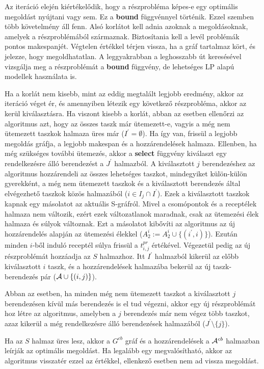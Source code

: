Az iteráció elején kiértékelődik, hogy a részprobléma képes-e egy optimális megoldást nyújtani vagy sem.
Ez a \textbf{bound} függvénnyel történik.
Ezzel szemben több követelmény áll fenn.
Alsó korlátot kell adnia azoknak a megoldásoknak, amelyek a részproblémából származnak.
Biztosítania kell a levél problémák pontos makespanjét.
Végtelen értékkel térjen vissza, ha a gráf tartalmaz kört, és jelezze, hogy megoldhatatlan.
A leggyakrabban a leghosszabb út keresésével vizsgálja meg a részproblémát a \textbf{bound} függvény, de lehetséges LP alapú modellek használata is.

Ha a korlát nem kisebb, mint az eddig megtalált legjobb eredmény, akkor az iteráció véget ér, és amennyiben létezik egy következő részprobléma, akkor az kerül kiválasztásra.
Ha viszont kisebb a korlát, abban az esetben ellenőrzi az algoritmus azt, hogy az összes taszk már ütemezett-e, vagyis a még nem ütemezett taszkok halmaza üres már ($I^{'}=\emptyset$).
Ha így van, frissül a legjobb megoldás gráfja, a legjobb makespan és a hozzárendelések halmaza.
Ellenben, ha még szükséges további ütemezés, akkor a \textbf{select} függvény kiválaszt egy rendelkezésre álló berendezést a $J^{'}$ halmazból.
A kiválasztott $j$ berendezéshez az algoritmus hozzárendeli az összes lehetséges taszkot, mindegyiket külön-külön gyerekként, a még nem ütemezett taszkok és a kiválasztott berendezés által elvégezhető taszkok közös halmazából ($i \in I_{j} \cap I^{'}$).
Ezek a kiválasztott taszkok kapnak egy másolatot az aktuális S-gráfról.
Mivel a csomópontok és a receptélek halmaza nem változik, ezért ezek változatlanok maradnak, csak az ütemezési élek halmaza és súlyok változnak.
Ezt a másolatot kibővíti az algoritmus az új hozzárendelés alapján az ütemezési élekkel ($A^{i}_{2}:= A^{i}_{2} \cup \{(i^{'},i)\}$).
Ezután minden $i$-ből induló receptél súlya frissül a $t^{pr}_{i,j}$ értékével.
Végezetül pedig az új részproblémát hozzáadja az $S$ halmazhoz.
Itt $I^{'}$ halmazból kikerül az előbb kiválasztott $i$ taszk, és a hozzárendelések halmazába bekerül az új taszk-berendezés pár (${\cal A}\cup\{(i,j)\}$).

Abban az esetben, ha minden még nem ütemezett taszkot a kiválasztott $j$ berendezésen kívül más berendezés is el tud végezni, akkor egy új részproblémát hoz létre az algoritmus, amelyben a $j$ berendezés már nem végez több taszkot, azaz kikerül a még rendelkezésre álló berendezések halmazából ($J^{'}\setminus\{j\}$).

Ha az $S$ halmaz üres lesz, akkor a $G^{cb}$ gráf és a hozzárendelések a ${\cal A}^{cb}$ halmazban leírják az optimális megoldást.
Ha legalább egy megvalósítható, akkor az algoritmus visszatér ezzel az értékkel, ellenkező esetben nem ad vissza megoldást.

